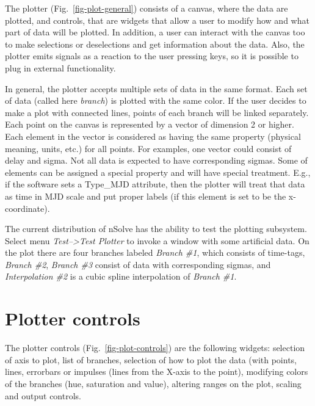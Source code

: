 \documentclass [10pt,letterpaper]{report}
\newcommand{\nuSolve}{\greektext n\latintext Solve}
\begin{document}
The plotter (Fig.~\ref{fig-plot-general}) consists of a canvas, where
the data are plotted, and controls, that are widgets that allow a user
to modify how and what part of data will be plotted. In addition, a user
can interact with the canvas too to make selections or deselections and
get information about the data. Also, the plotter emits signals as a
reaction to the user pressing keys, so it is possible to plug in
external functionality.

In general, the plotter accepts multiple sets of data in the same
format. Each set of data (called here {\it branch}) is plotted with the
same color. If the user decides to make a plot with connected lines,
points of each branch will be linked separately. Each point on the canvas is
represented by a vector of dimension 2 or higher. Each element in the
vector is considered as having the same property (physical meaning,
units, etc.) for all points. For examples, one vector could consist of
delay and sigma. Not all data is expected to have corresponding sigmas.
Some of elements can be assigned a special property and will have
special treatment. E.g., if the software sets a Type\_MJD attribute,
then the plotter will treat that data as time in MJD scale and put
proper labels (if this element is set to be the x-coordinate).

The current distribution of \nuSolve{} has the ability to test the
plotting subsystem. Select menu {\sl Test-->Test Plotter} to invoke a
window with some artificial data. On the plot there are four branches
labeled {\sl Branch \#1}, which consists of time-tags, {\sl Branch
\#2}, {\sl Branch \#3} consist of data with corresponding sigmas, and
{\sl Interpolation \#2} is a cubic spline interpolation of {\sl
Branch \#1}.



\section{Plotter controls}
The plotter controls (Fig.~\ref{fig-plot-controls}) are the following
widgets: selection of axis to plot, list of branches, selection of how
to plot the data (with points, lines, errorbars or impulses (lines from
the X-axis to the point), modifying colors of the branches (hue,
saturation and value), altering ranges on the plot, scaling and output
controls.
\end{document}
